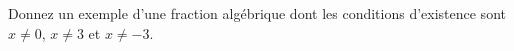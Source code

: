 %
%
    Donnez un exemple d'une fraction algébrique dont les conditions d'existence sont \(x\ne 0\), \(x\ne 3\) et \(x\ne -3\).
